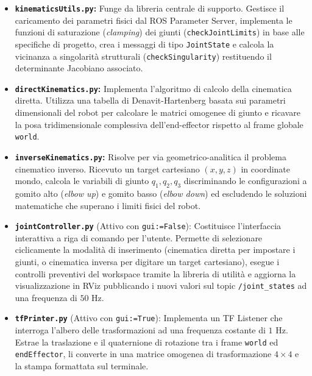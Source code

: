 \documentclass[11pt, a4paper]{report}
\begin{document}
\begin{itemize}
    \item \textbf{\texttt{kinematicsUtils.py}:} Funge da libreria centrale di supporto. Gestisce il caricamento dei parametri fisici dal ROS Parameter Server, implementa le funzioni di saturazione (\textit{clamping}) dei giunti (\texttt{checkJointLimits}) in base alle specifiche di progetto, crea i messaggi di tipo \texttt{JointState} e calcola la vicinanza a singolarità strutturali (\texttt{checkSingularity}) restituendo il determinante Jacobiano associato.

    \item \textbf{\texttt{directKinematics.py}:} Implementa l'algoritmo di calcolo della cinematica diretta. Utilizza una tabella di Denavit-Hartenberg basata sui parametri dimensionali del robot per calcolare le matrici omogenee di giunto e ricavare la posa tridimensionale complessiva dell'end-effector rispetto al frame globale \texttt{world}.

    \item \textbf{\texttt{inverseKinematics.py}:} Risolve per via geometrico-analitica il problema cinematico inverso. Ricevuto un target cartesiano $(x, y, z)$ in coordinate mondo, calcola le variabili di giunto $q_1, q_2, q_3$ discriminando le configurazioni a gomito alto (\textit{elbow up}) e gomito basso (\textit{elbow down}) ed escludendo le soluzioni matematiche che superano i limiti fisici del robot.

    \item \texttt{\textbf{jointController.py}} (Attivo con \texttt{gui:=False}): Costituisce l'interfaccia interattiva a riga di comando per l'utente. Permette di selezionare ciclicamente la modalità di inserimento (cinematica diretta per impostare i giunti, o cinematica inversa per digitare un target cartesiano), esegue i controlli preventivi del workspace tramite la libreria di utilità e aggiorna la visualizzazione in RViz pubblicando i nuovi valori sul topic \texttt{/joint\_states} ad una frequenza di $50$ Hz.

    \item \texttt{\textbf{tfPrinter.py}} (Attivo con \texttt{gui:=True}): Implementa un TF Listener che interroga l'albero delle trasformazioni ad una frequenza costante di $1$ Hz. Estrae la traslazione e il quaternione di rotazione tra i frame \texttt{world} ed \texttt{endEffector}, li converte in una matrice omogenea di trasformazione $4 \times 4$ e la stampa formattata sul terminale.
\end{itemize}
\end{document}
